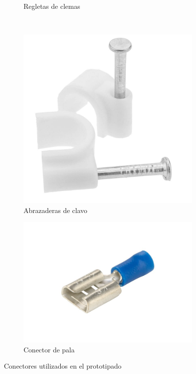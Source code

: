 \begin{figure}[H]
\begin{subfigure}[b]{0.25\textwidth}
        \caption{Regletas de clemas}
    \end{subfigure}
    \\
    \begin{subfigure}[b]{0.25\textwidth}
        \includegraphics[width=\textwidth]{images/2-hardware/abrazaderaClavo.png}
        \caption{Abrazaderas de clavo}
    \end{subfigure}
    \hspace{2cm}
    \begin{subfigure}[b]{0.25\textwidth}
        \includegraphics[width=\textwidth]{images/2-hardware/spadeConnector.png}       
        \caption{Conector de pala}
    \end{subfigure}
    \caption{Conectores utilizados en el prototipado}
    \label{fig:hardware/proto/conectores}
\end{figure}

